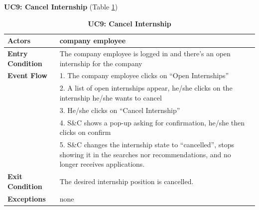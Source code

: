 \textbf{UC9: Cancel Internship }(Table \ref{tab:UC9})
\begin{table}[H]
\centering
\caption{\textbf{UC9: Cancel Internship}}
\label{tab:UC9}
\begin{tabularx}{\textwidth}{|X|X|}
\hline
\textbf{Actors}           & company employee                                         \\ \hline
\textbf{Entry Condition}   & The company employee is logged in and there’s an open internship for the company \\ \hline
\textbf{Event Flow}        & 1. The company employee clicks on “Open Internships”         \\
                           & 2. A list of open internships appear, he/she clicks on the internship he/she wants to cancel \\
                           & 3. He/she clicks on “Cancel Internship”                     \\
                           & 4. S\&C shows a pop-up asking for confirmation, he/she then clicks on confirm \\
                           & 5. S\&C changes the internship state to “cancelled”, stops showing it in the searches nor recommendations, and no longer receives applications. \\ \hline
\textbf{Exit Condition}    & The desired internship position is cancelled.             \\ \hline
\textbf{Exceptions}        & none                                                      \\ \hline
\end{tabularx}
\end{table}

